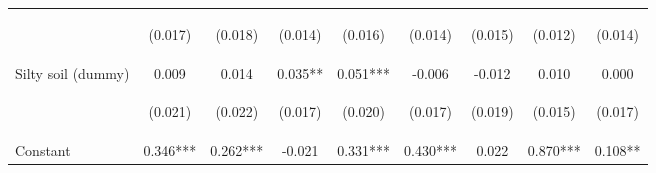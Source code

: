 \begin{center}
\begin{tabular}{lcccccccc}
\vspace{4pt} & \begin{footnotesize}(0.017)\end{footnotesize} & \begin{footnotesize}(0.018)\end{footnotesize} & \begin{footnotesize}(0.014)\end{footnotesize} & \begin{footnotesize}(0.016)\end{footnotesize} & \begin{footnotesize}(0.014)\end{footnotesize} & \begin{footnotesize}(0.015)\end{footnotesize} & \begin{footnotesize}(0.012)\end{footnotesize} & \begin{footnotesize}(0.014)\end{footnotesize} \\
Silty soil (dummy) & 0.009 & 0.014 & 0.035** & 0.051*** & -0.006 & -0.012 & 0.010 & 0.000 \\
\vspace{4pt} & \begin{footnotesize}(0.021)\end{footnotesize} & \begin{footnotesize}(0.022)\end{footnotesize} & \begin{footnotesize}(0.017)\end{footnotesize} & \begin{footnotesize}(0.020)\end{footnotesize} & \begin{footnotesize}(0.017)\end{footnotesize} & \begin{footnotesize}(0.019)\end{footnotesize} & \begin{footnotesize}(0.015)\end{footnotesize} & \begin{footnotesize}(0.017)\end{footnotesize} \\
Constant & 0.346*** & 0.262*** & -0.021 & 0.331*** & 0.430*** & 0.022 & 0.870*** & 0.108** \\

\end{tabular}
\end{center}
